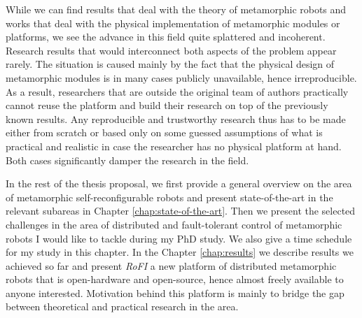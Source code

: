While we can find results that deal with the theory of metamorphic robots and
works that deal with the physical implementation of metamorphic modules or
platforms, we see the advance in this field quite splattered and incoherent.
Research results that would interconnect both aspects of the problem appear
rarely. The situation is caused mainly by the fact that the physical design of
metamorphic modules is in many cases publicly unavailable, hence irreproducible.
As a result, researchers that are outside the original team of authors
practically cannot reuse the platform and build their research on top of the
previously known results.  Any reproducible and trustworthy research thus has to
be made either from scratch or based only on some guessed assumptions of what is
practical and realistic in case the researcher has no physical platform at hand.
Both cases significantly damper the research in the field.

In the rest of the thesis proposal, we first provide a general overview on the
area of metamorphic self-reconfigurable robots and present state-of-the-art in
the relevant subareas in Chapter \ref{chap:state-of-the-art}. Then we present
the selected challenges in the area of distributed and fault-tolerant control of
metamorphic robots I would like to tackle during my PhD study. We also give a
time schedule for my study in this chapter. In the Chapter \ref{chap:results} we
describe results we achieved so far and present \emph{RoFI} a new platform of
distributed metamorphic robots that is open-hardware and open-source, hence
almost freely available to anyone interested. Motivation behind this platform is
mainly to bridge the gap between theoretical and practical research in the
area.